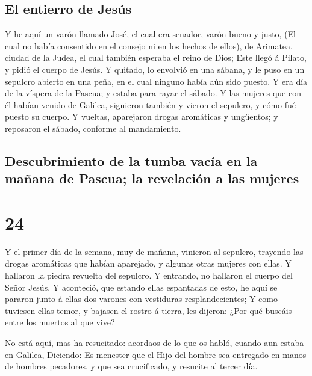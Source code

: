 \hypertarget{el-entierro-de-jesuxfas}{%
\subsection{El entierro de Jesús}\label{el-entierro-de-jesuxfas}}

 Y he aquí un varón llamado José, el cual era senador,
varón bueno y justo,  (El cual no había consentido en el
consejo ni en los hechos de ellos), de Arimatea, ciudad de la Judea, el
cual también esperaba el reino de Dios;  Este llegó á
Pilato, y pidió el cuerpo de Jesús.  Y quitado, lo
envolvió en una sábana, y le puso en un sepulcro abierto en una peña, en
el cual ninguno había aún sido puesto.  Y era día de la
víspera de la Pascua; y estaba para rayar el sábado.  Y
las mujeres que con él habían venido de Galilea, siguieron también y
vieron el sepulcro, y cómo fué puesto su cuerpo.  Y
vueltas, aparejaron drogas aromáticas y ungüentos; y reposaron el
sábado, conforme al mandamiento.

\hypertarget{descubrimiento-de-la-tumba-vacuxeda-en-la-mauxf1ana-de-pascua-la-revelaciuxf3n-a-las-mujeres}{%
\subsection{Descubrimiento de la tumba vacía en la mañana de Pascua; la
revelación a las
mujeres}\label{descubrimiento-de-la-tumba-vacuxeda-en-la-mauxf1ana-de-pascua-la-revelaciuxf3n-a-las-mujeres}}

\hypertarget{section-42-24}{%
\section{24}\label{section-42-24}}

 Y el primer día de la semana, muy de mañana, vinieron al
sepulcro, trayendo las drogas aromáticas que habían aparejado, y algunas
otras mujeres con ellas.  Y hallaron la piedra revuelta
del sepulcro.  Y entrando, no hallaron el cuerpo del Señor
Jesús.  Y aconteció, que estando ellas espantadas de esto,
he aquí se pararon junto á ellas dos varones con vestiduras
resplandecientes;  Y como tuviesen ellas temor, y bajasen
el rostro á tierra, les dijeron: ¿Por qué buscáis entre los muertos al
que vive?

 No está aquí, mas ha resucitado: acordaos de lo que os
habló, cuando aun estaba en Galilea,  Diciendo: Es
menester que el Hijo del hombre sea entregado en manos de hombres
pecadores, y que sea crucificado, y resucite al tercer día.

